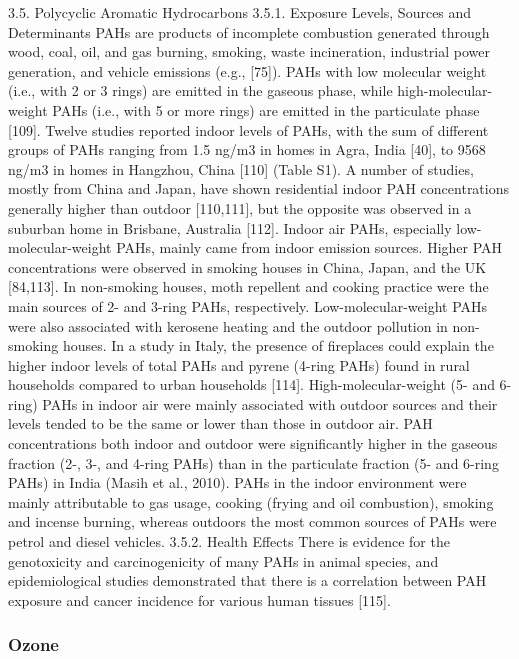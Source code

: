 \cite{ijerph17238972}

 3.5. Polycyclic Aromatic Hydrocarbons
3.5.1. Exposure Levels, Sources and Determinants
PAHs are products of incomplete combustion generated through wood, coal, oil, and gas burning, smoking, waste incineration, industrial power generation, and vehicle emissions (e.g., [75]). PAHs with low molecular weight (i.e., with 2 or 3 rings) are emitted in the gaseous phase, while high-molecular-weight PAHs (i.e., with 5 or more rings) are emitted in the particulate phase [109].
Twelve studies reported indoor levels of PAHs, with the sum of different groups of PAHs ranging from 1.5 ng/m3 in homes in Agra, India [40], to 9568 ng/m3 in homes in Hangzhou, China [110] (Table S1). A number of studies, mostly from China and Japan, have shown residential indoor PAH concentrations generally higher than outdoor [110,111], but the opposite was observed in a suburban home in Brisbane, Australia [112]. Indoor air PAHs, especially low-molecular-weight PAHs, mainly came from indoor emission sources. Higher PAH concentrations were observed in smoking houses in China, Japan, and the UK [84,113]. In non-smoking houses, moth repellent and cooking practice were the main sources of 2- and 3-ring PAHs, respectively. Low-molecular-weight PAHs were also associated with kerosene heating and the outdoor pollution in non-smoking houses. In a study in Italy, the presence of fireplaces could explain the higher indoor levels of total PAHs and pyrene (4-ring PAHs) found in rural households compared to urban households [114]. High-molecular-weight (5- and 6-ring) PAHs in indoor air were mainly associated with outdoor sources and their levels tended to be the same or lower than those in outdoor air.
PAH concentrations both indoor and outdoor were significantly higher in the gaseous fraction (2-, 3-, and 4-ring PAHs) than in the particulate fraction (5- and 6-ring PAHs) in India (Masih et al., 2010). PAHs in the indoor environment were mainly attributable to gas usage, cooking (frying and oil combustion), smoking and incense burning, whereas outdoors the most common sources of PAHs were petrol and diesel vehicles.
3.5.2. Health Effects
There is evidence for the genotoxicity and carcinogenicity of many PAHs in animal species, and epidemiological studies demonstrated that there is a correlation between PAH exposure and cancer incidence for various human tissues [115].

\cite{ijerph17238972}


\subsubsection{Ozone}

